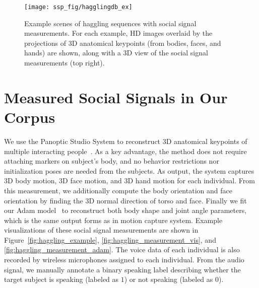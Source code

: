 \begin{figure}
	\centering
	\texttt{[image: ssp\_fig/hagglingdb\_ex]}
	\caption{Example scenes of haggling sequences with social signal measurements. For each example, HD images overlaid by the projections of 3D anatomical keypoints (from bodies, faces, and hands) are shown, along with a 3D view of the social signal measurements (top right).} 
	\label{fig:haggling_db}
\end{figure}

\section{Measured Social Signals in Our Corpus}
We use the Panoptic Studio System to reconstruct 3D anatomical keypoints of multiple interacting people~\cite{joo2017panoptic, joo2018}. As a key advantage, the method does not require attaching markers on subject's body, and no behavior restrictions nor initialization poses are needed from the subjects. As output, the system captures 3D body motion, 3D face motion, and 3D hand motion for each individual. From this measurement, we additionally compute the body orientation and face orientation by finding the 3D normal direction of torso and face. Finally we fit our Adam model~\cite{joo2018} to reconstruct both body shape and joint angle parameters, which is the same output forms as in motion capture system. Example visualizations of these social signal measurements are shown in Figure~\ref{fig:haggling_example}, \ref{fig:haggling_measurement_vis}, and \ref{fig:haggling_measurement_adam}. The voice data of each individual is also recorded by wireless microphones assigned to each individual. From the audio signal, we manually annotate a binary speaking label describing whether the target subject is speaking (labeled as $1$) or not speaking (labeled as $0$).


